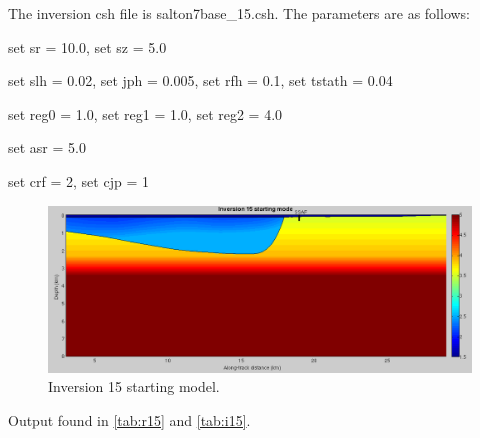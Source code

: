 \documentclass[fontsize=11pt, %
                             paper=a4, %
                             twoside, %
                             captions=tableheading,
                             index=totoc,
                             hyperref]{labbook}
\begin{document}
\begin{addmargin}[4cm]{0cm}
The inversion csh file is salton7base\_15.csh.  The parameters are as follows:

set sr = 10.0, set sz = 5.0

set slh =  0.02,
set jph =  0.005,
set rfh =  0.1,
set tstath = 0.04

set reg0 =    1.0, set reg1 =    1.0, set reg2 =   4.0

set asr = 5.0

set crf = 2, set cjp = 1

\begin{figure}[h!]
\raggedleft
\includegraphics[scale=0.4,keepaspectratio=true]{figs/inv15_0.png}
\caption{Inversion 15 starting model.}
\label{fig:inv15start}
\end{figure}

\clearpage{}

Output found in \autoref{tab:r15} and \autoref{tab:i15}.


\end{addmargin}
\end{document}
